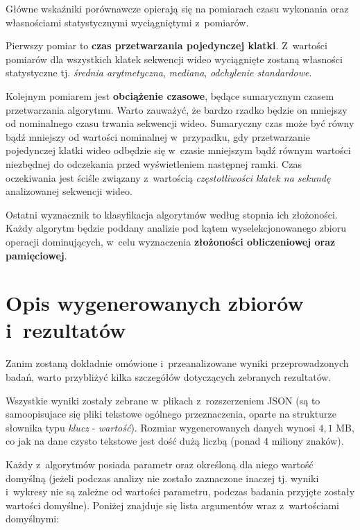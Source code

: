       Główne wskaźniki porównawcze opierają się na pomiarach czasu wykonania oraz własnościami statystycznymi wyciągniętymi z~pomiarów.

      Pierwszy pomiar to \textbf{czas przetwarzania pojedynczej klatki}. Z~wartości pomiarów dla wszystkich klatek sekwencji wideo wyciągnięte zostaną własności statystyczne tj. \textit{średnia arytmetyczna}, \textit{mediana}, \textit{odchylenie standardowe}.

      Kolejnym pomiarem jest \textbf{obciążenie czasowe}, będące sumarycznym czasem przetwarzania algorytmu. Warto zauważyć, że bardzo rzadko będzie on mniejszy od nominalnego czasu trwania sekwencji wideo. Sumaryczny czas może być równy bądź mniejszy od wartości nominalnej w~przypadku, gdy przetwarzanie pojedynczej klatki wideo odbędzie się w~czasie mniejszym bądź równym wartości niezbędnej do odczekania przed wyświetleniem następnej ramki. Czas oczekiwania jest ściśle związany z~wartością \textit{częstotliwości klatek na sekundę} analizowanej sekwencji wideo.

      Ostatni wyznacznik to klasyfikacja algorytmów według stopnia ich złożoności. Każdy algorytm będzie poddany analizie pod kątem wyselekcjonowanego zbioru operacji dominujących, w~celu wyznaczenia \textbf{złożoności obliczeniowej oraz pamięciowej}.

  \section{Opis wygenerowanych zbiorów i~rezultatów}\label{Section_Results}
    Zanim zostaną dokładnie omówione i~przeanalizowane wyniki przeprowadzonych badań, warto przybliżyć kilka szczegółów dotyczących zebranych rezultatów.

    Wszystkie wyniki zostały zebrane w~plikach z~rozszerzeniem JSON (są to samoopisujace się pliki tekstowe ogólnego przeznaczenia, oparte na strukturze słownika typu \textit{klucz} - \textit{wartość}). Rozmiar wygenerowanych danych wynosi $4,1$ MB, co jak na dane czysto tekstowe jest dość dużą liczbą (ponad 4 miliony znaków).

    Każdy z~algorytmów posiada parametr oraz określoną dla niego wartość domyślną (jeżeli podczas analizy nie zostało zaznaczone inaczej tj. wyniki i~wykresy nie są zależne od wartości parametru, podczas badania przyjęte zostały wartości domyślne). Poniżej znajduje się lista argumentów wraz z~wartościami domyślnymi:

